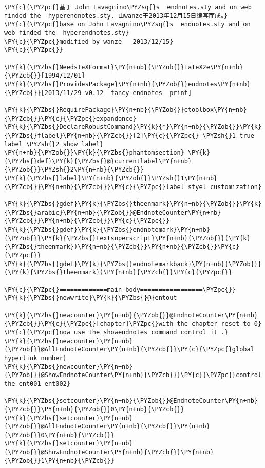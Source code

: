 \begin{Verbatim}[commandchars=\\\{\}]
\PY{c}{\PYZpc{}基于 John Lavagnino\PYZsq{}s  endnotes.sty and on web finded the  hyperendnotes.sty, 由wanze于2013年12月15日编写而成。}
\PY{c}{\PYZpc{}base on John Lavagnino\PYZsq{}s  endnotes.sty and on web finded the  hyperendnotes.sty}
\PY{c}{\PYZpc{}modified by wanze   2013/12/15}
\PY{c}{\PYZpc{}}

\PY{k}{\PYZbs{}NeedsTeXFormat}\PY{n+nb}{\PYZob{}}LaTeX2e\PY{n+nb}{\PYZcb{}}[1994/12/01]
\PY{k}{\PYZbs{}ProvidesPackage}\PY{n+nb}{\PYZob{}}endnotes\PY{n+nb}{\PYZcb{}}[2013/11/29 v0.12  fancy endnotes  print]

\PY{k}{\PYZbs{}RequirePackage}\PY{n+nb}{\PYZob{}}etoolbox\PY{n+nb}{\PYZcb{}}\PY{c}{\PYZpc{}expandonce}
\PY{k}{\PYZbs{}DeclareRobustCommand}\PY{k}{*}\PY{n+nb}{\PYZob{}}\PY{k}{\PYZbs{}flabel}\PY{n+nb}{\PYZcb{}}[2]\PY{c}{\PYZpc{} \PYZsh{}1 true label \PYZsh{}2 show label}
\PY{n+nb}{\PYZob{}}\PY{k}{\PYZbs{}phantomsection} \PY{k}{\PYZbs{}def}\PY{k}{\PYZbs{}@}currentlabel\PY{n+nb}{\PYZob{}}\PYZsh{}2\PY{n+nb}{\PYZcb{}}
\PY{k}{\PYZbs{}label}\PY{n+nb}{\PYZob{}}\PYZsh{}1\PY{n+nb}{\PYZcb{}}\PY{n+nb}{\PYZcb{}}\PY{c}{\PYZpc{}label styel customization}

\PY{k}{\PYZbs{}gdef}\PY{k}{\PYZbs{}theenmark}\PY{n+nb}{\PYZob{}}\PY{k}{\PYZbs{}arabic}\PY{n+nb}{\PYZob{}}@EndnoteCounter\PY{n+nb}{\PYZcb{}}\PY{n+nb}{\PYZcb{}}\PY{c}{\PYZpc{}}
\PY{k}{\PYZbs{}gdef}\PY{k}{\PYZbs{}endnotemark}\PY{n+nb}{\PYZob{}}\PY{k}{\PYZbs{}textsuperscript}\PY{n+nb}{\PYZob{}}(\PY{k}{\PYZbs{}theenmark})\PY{n+nb}{\PYZcb{}}\PY{n+nb}{\PYZcb{}}\PY{c}{\PYZpc{}}
\PY{k}{\PYZbs{}gdef}\PY{k}{\PYZbs{}endnotemarkback}\PY{n+nb}{\PYZob{}}(\PY{k}{\PYZbs{}theenmark})\PY{n+nb}{\PYZcb{}}\PY{c}{\PYZpc{}}

\PY{c}{\PYZpc{}=============main body=================\PYZpc{}}
\PY{k}{\PYZbs{}newwrite}\PY{k}{\PYZbs{}@}entout

\PY{k}{\PYZbs{}newcounter}\PY{n+nb}{\PYZob{}}@EndnoteCounter\PY{n+nb}{\PYZcb{}}\PY{c}{\PYZpc{}[chapter]\PYZpc{}with the chapter reset to 0}
\PY{c}{\PYZpc{}now use the showendnotes command control it .}
\PY{k}{\PYZbs{}newcounter}\PY{n+nb}{\PYZob{}}@AllEndnoteCounter\PY{n+nb}{\PYZcb{}}\PY{c}{\PYZpc{}global hyperlink number}
\PY{k}{\PYZbs{}newcounter}\PY{n+nb}{\PYZob{}}@ShowEndnoteCounter\PY{n+nb}{\PYZcb{}}\PY{c}{\PYZpc{}control the ent001 ent002}

\PY{k}{\PYZbs{}setcounter}\PY{n+nb}{\PYZob{}}@EndnoteCounter\PY{n+nb}{\PYZcb{}}\PY{n+nb}{\PYZob{}}0\PY{n+nb}{\PYZcb{}}
\PY{k}{\PYZbs{}setcounter}\PY{n+nb}{\PYZob{}}@AllEndnoteCounter\PY{n+nb}{\PYZcb{}}\PY{n+nb}{\PYZob{}}0\PY{n+nb}{\PYZcb{}}
\PY{k}{\PYZbs{}setcounter}\PY{n+nb}{\PYZob{}}@ShowEndnoteCounter\PY{n+nb}{\PYZcb{}}\PY{n+nb}{\PYZob{}}1\PY{n+nb}{\PYZcb{}}


\end{Verbatim}

